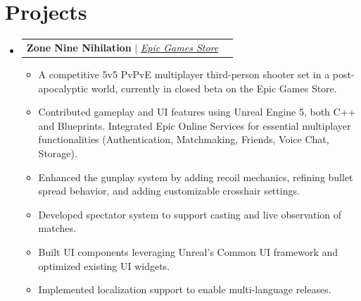 \documentclass[letterpaper,11pt]{article}
\makeatletter
\newcommand{\resumeItem}[1]{
  \item\small{
    {#1 \vspace{-2pt}}
  }
}
\newcommand{\resumeProjectHeading}[2]{
    \vspace{-2pt}\item
    \begin{tabular*}{0.97\textwidth}{l@{\extracolsep{\fill}}r}
      \small#1 & #2 \\
    \end{tabular*}\vspace{-7pt}
}
\newcommand{\resumeSubHeadingListStart}{\begin{itemize}[leftmargin=0.15in, label={}]}
\newcommand{\resumeSubHeadingListEnd}{\end{itemize}}
\newcommand{\resumeItemListStart}{\begin{itemize}}
\newcommand{\resumeItemListEnd}{\end{itemize}\vspace{-5pt}}
\makeatother
\begin{document}

\section{Projects}
\vspace{3pt}
\resumeSubHeadingListStart

\resumeProjectHeading
{\textbf{Zone Nine Nihilation} $|$ \emph{\href{https://store.epicgames.com/en-US/p/zone-nine-nihilation-dd79bd}{\color{blue}Epic Games Store}}}{}
\resumeItemListStart
\resumeItem{A competitive 5v5 PvPvE multiplayer third-person shooter set in a post-apocalyptic world, currently in closed beta on the Epic Games Store.}
\resumeItem{Contributed gameplay and UI features using Unreal Engine 5, both C++ and Blueprints. Integrated Epic Online Services for essential multiplayer functionalities (Authentication, Matchmaking, Friends, Voice Chat, Storage).}
\resumeItem{Enhanced the gunplay system by adding recoil mechanics, refining bullet spread behavior, and adding customizable crosshair settings.}
\resumeItem{Developed spectator system to support casting and live observation of matches.}
\resumeItem{Built UI components leveraging Unreal's Common UI framework and optimized existing UI widgets.}
\resumeItem{Implemented localization support to enable multi-language releases.}
\resumeItemListEnd

\resumeSubHeadingListEnd





\end{document}
